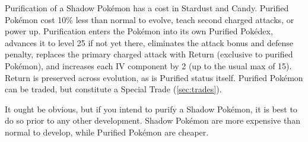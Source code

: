Purification of a Shadow Pokémon has a cost in Stardust and Candy.
Purified Pokémon cost 10\% less than normal to evolve, teach second charged attacks, or power up.
Purification enters the Pokémon into its own Purified Pokédex,
 advances it to level 25 if not yet there,
 eliminates the attack bonus and defense penalty,
 replaces the primary charged attack with Return (exclusive to purified Pokémon),
 and increases each IV component by 2  (up to the usual max of 15).
Return is preserved across evolution, as is Purified status itself.
Purified Pokémon can be traded, but constitute a Special Trade (\autoref{sec:trades}).

It ought be obvious, but if you intend to purify a Shadow Pokémon, it
  is best to do so prior to any other development.
Shadow Pokémon are more expensive than normal to develop, while Purified Pokémon are cheaper.

